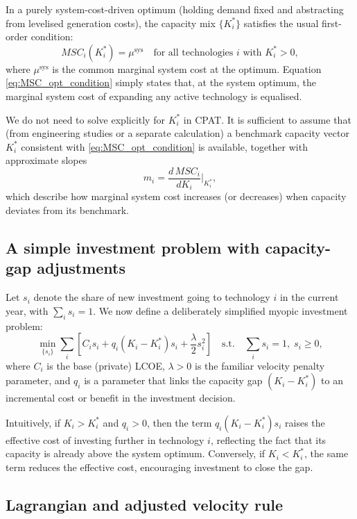 \documentclass[preprint,authoryear,12pt]{elsarticle}
\begin{document}
In a purely system-cost-driven optimum (holding demand fixed and abstracting from levelised
generation costs), the capacity mix $\{K_i^*\}$ satisfies the usual first-order condition:
\begin{equation}
    MSC_i(K_i^*) = \mu^{\text{sys}}
    \quad \text{for all technologies $i$ with } K_i^* > 0,
    \label{eq:MSC_opt_condition}
\end{equation}
where $\mu^{\text{sys}}$ is the common marginal system cost at the optimum. Equation
\eqref{eq:MSC_opt_condition} simply states that, at the system optimum, the marginal system
cost of expanding any active technology is equalised.

We do not need to solve explicitly for $K_i^*$ in CPAT. It is sufficient to assume that (from
engineering studies or a separate calculation) a benchmark capacity vector $K_i^*$ consistent
with \eqref{eq:MSC_opt_condition} is available, together with approximate slopes
\[
    m_i = \frac{d\,MSC_i}{dK_i}\Big|_{K_i^*},
\]
which describe how marginal system cost increases (or decreases) when capacity deviates from its
benchmark.

\subsection*{A simple investment problem with capacity-gap adjustments}

Let $s_i$ denote the share of new investment going to technology $i$ in the current year, with
$\sum_i s_i = 1$. We now define a deliberately simplified myopic investment problem:
\begin{equation}
    \min_{\{s_i\}} \sum_i
    \left[
        C_i s_i
      + q_i (K_i - K_i^*) s_i
      + \frac{\lambda}{2} s_i^2
    \right]
    \quad \text{s.t.} \quad \sum_i s_i = 1,\; s_i \ge 0,
    \label{eq:capacity_gap_objective}
\end{equation}
where $C_i$ is the base (private) LCOE, $\lambda>0$ is the familiar velocity penalty parameter,
and $q_i$ is a parameter that links the capacity gap $(K_i - K_i^*)$ to an incremental cost or
benefit in the investment decision.

Intuitively, if $K_i > K_i^*$ and $q_i > 0$, then the term $q_i (K_i - K_i^*) s_i$ raises the
effective cost of investing further in technology $i$, reflecting the fact that its capacity is
already above the system optimum. Conversely, if $K_i < K_i^*$, the same term reduces the
effective cost, encouraging investment to close the gap.

\subsection*{Lagrangian and adjusted velocity rule}
\end{document}

